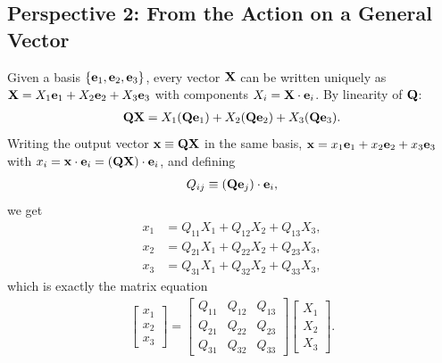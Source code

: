 \documentclass[
  letterpaper,
  DIV=11,
  numbers=noendperiod]{scrreprt}
\newcommand{\lp}{\left(}
\newcommand{\rp}{\right)}
\begin{document}
\subsection{Perspective 2: From the Action on a General
Vector}\label{perspective-2-from-the-action-on-a-general-vector}

Given a basis \(\{{\bf e}_1,{\bf e}_2,{\bf e}_3\}\), every vector
\({\bf X}\) can be written uniquely as
\({\bf X} = X_1{\bf e}_1+X_2{\bf e}_2+X_3{\bf e}_3\) with components
\(X_i = {\bf X}\cdot{\bf e}_i\). By linearity of \({\bf Q}\):
\begin{align}
    {\bf Q}{\bf X} = X_1({\bf Q}{\bf e}_1)+X_2({\bf Q}{\bf e}_2)+X_3({\bf Q}{\bf e}_3).
\end{align} Writing the output vector \({\bf x}\equiv{\bf Q}{\bf X}\) in
the same basis, \({\bf x} = x_1{\bf e}_1+x_2{\bf e}_2+x_3{\bf e}_3\)
with \(x_i = {\bf x}\cdot{\bf e}_i = ({\bf Q}{\bf X})\cdot{\bf e}_i\),
and defining \begin{align}
    Q_{ij} \equiv \lp{\bf Q}{\bf e}_j\rp\cdot{\bf e}_i,
\end{align} we get \begin{align}
    x_1 &= Q_{11}X_1+Q_{12}X_2+Q_{13}X_3,\\
    x_2 &= Q_{21}X_1+Q_{22}X_2+Q_{23}X_3,\\
    x_3 &= Q_{31}X_1+Q_{32}X_2+Q_{33}X_3,
\end{align} which is exactly the matrix equation \begin{align}
    \begin{bmatrix}x_1\\x_2\\x_3\end{bmatrix}
    =
    \begin{bmatrix}Q_{11}&Q_{12}&Q_{13}\\Q_{21}&Q_{22}&Q_{23}\\Q_{31}&Q_{32}&Q_{33}\end{bmatrix}
    \begin{bmatrix}X_1\\X_2\\X_3\end{bmatrix}.
\end{align}
\end{document}
